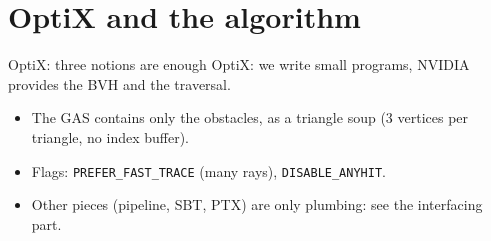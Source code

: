 \documentclass[aspectratio=169,10pt]{beamer}
\begin{document}
\section{OptiX and the algorithm}
\begin{frame}{OptiX: three notions are enough}
  OptiX: we write small programs, NVIDIA provides the BVH and the traversal.
  \begin{center}
  \end{center}
  \begin{itemize}
    \item The GAS contains \alert{only the obstacles}, as a triangle soup (3 vertices per triangle, no index buffer).
    \item Flags: \texttt{PREFER\_FAST\_TRACE} (many rays), \texttt{DISABLE\_ANYHIT}.
    \item Other pieces (pipeline, SBT, PTX) are only plumbing: see the interfacing part.
  \end{itemize}
\end{frame}
\end{document}
